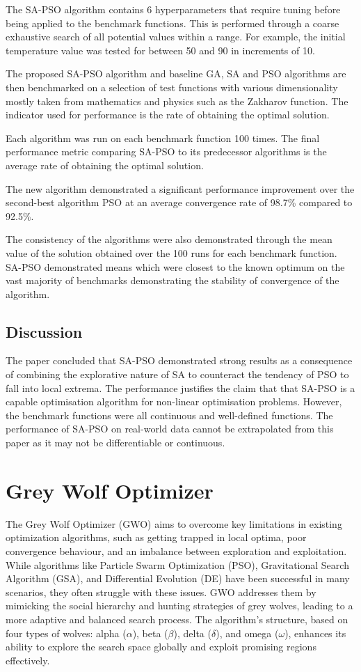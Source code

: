 \documentclass[a4paper, 12pt]{extarticle}
\begin{document}
The SA-PSO algorithm contains 6 hyperparameters that require tuning before being applied to the benchmark functions. This is performed through a coarse exhaustive search of all potential values within a range. For example, the initial temperature value was tested for between 50 and 90 in increments of 10.

The proposed SA-PSO algorithm and baseline GA, SA and PSO algorithms are then benchmarked on a selection of test functions with various dimensionality mostly taken from mathematics and physics such as the Zakharov function. The indicator used for performance is the rate of obtaining the optimal solution.

Each algorithm was run on each benchmark function 100 times. The final performance metric comparing SA-PSO to its predecessor algorithms is the average rate of obtaining the optimal solution.

The new algorithm demonstrated a significant performance improvement over the second-best algorithm PSO at an average convergence rate of 98.7\% compared to 92.5\%.

The consistency of the algorithms were also demonstrated through the mean value of the solution obtained over the 100 runs for each benchmark function. SA-PSO demonstrated means which were closest to the known optimum on the vast majority of benchmarks demonstrating the stability of convergence of the algorithm.

\subsection{Discussion}

The paper concluded that SA-PSO demonstrated strong results as a consequence of combining the explorative nature of SA to counteract the tendency of PSO to fall into local extrema. The performance justifies the claim that that SA-PSO is a capable optimisation algorithm for non-linear optimisation problems. 
However, the benchmark functions were all continuous and well-defined functions. The performance of SA-PSO on real-world data cannot be extrapolated from this paper as it may not be differentiable or continuous.

\newpage
\section{Grey Wolf Optimizer}
The Grey Wolf Optimizer (GWO) aims to overcome key limitations in existing optimization algorithms, such as getting trapped in local optima, poor convergence behaviour, and an imbalance between exploration and exploitation. While algorithms like Particle Swarm Optimization (PSO), Gravitational Search Algorithm (GSA), and Differential Evolution (DE) have been successful in many scenarios, they often struggle with these issues. GWO addresses them by mimicking the social hierarchy and hunting strategies of grey wolves, leading to a more adaptive and balanced search process. The algorithm's structure, based on four types of wolves: alpha ($\alpha$), beta ($\beta$), delta ($\delta$), and omega ($\omega$), enhances its ability to explore the search space globally and exploit promising regions effectively\cite{mirjalili2014grey}.
\end{document}
